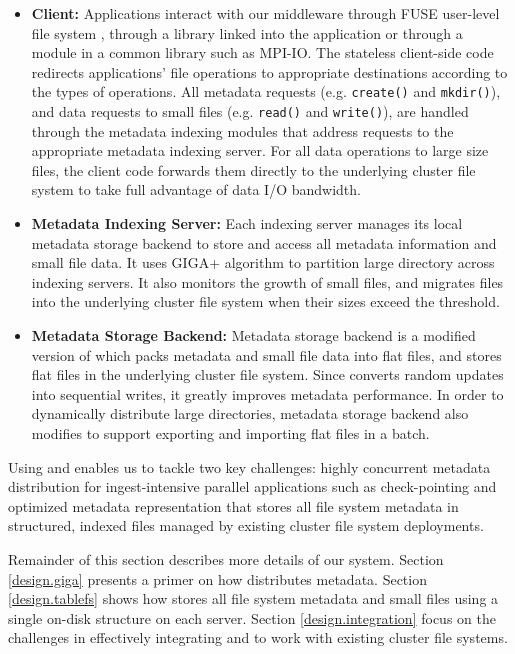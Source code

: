 \begin{itemize}
\item{\textbf{Client:}} Applications interact with our middleware
through FUSE user-level file system \cite{fuse},
through a library linked into the application
or through a module in a common library such as MPI-IO.
The stateless client-side code redirects applications' file operations
to appropriate destinations according to the types of operations.
All metadata requests (e.g. \texttt{create()} and \texttt{mkdir()}),
and data requests to small files (e.g. \texttt{read()} and \texttt{write()}),
are handled through the metadata indexing modules that address
requests to the appropriate metadata indexing server.
For all data operations to large size files, the client code forwards
them directly to the underlying cluster file system to take full
advantage of data I/O bandwidth.

\item{\textbf{Metadata Indexing Server:}}
Each indexing server manages its local metadata storage backend to store and
access all metadata information and small file data. It uses GIGA+ algorithm to
partition large directory across indexing servers. It also monitors the growth
of small files, and migrates files into the underlying cluster file system
when their sizes exceed the threshold.

\item{\textbf{Metadata Storage Backend:}}
Metadata storage backend is a modified version of \tfs which packs metadata and
small file data into flat files, and stores flat files
in the underlying cluster file system. Since \tfs converts random updates into
sequential writes, it greatly improves metadata performance. In order to
dynamically distribute large directories, metadata storage backend also modifies
\tfs to support exporting and importing flat files in a batch.

\end{itemize}


Using \giga and \tfs enables us to tackle two key challenges: highly
concurrent metadata distribution for ingest-intensive parallel applications
such as check-pointing \cite{PLFS} and
optimized metadata representation that stores all file system
metadata in structured, indexed files managed by existing cluster file system
deployments.

Remainder of this section describes more details of our system.
Section \ref{design.giga} presents a primer on how \giga distributes metadata.
Section \ref{design.tablefs} shows how \tfs stores all file system metadata
and small files using a single on-disk structure on each server.
Section \ref{design.integration} focus on the challenges in effectively
integrating \giga and \tfs to work with existing cluster file systems.


